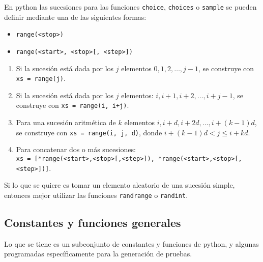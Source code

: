 \documentclass[12pt]{article}
\theoremstyle{definition}
\newtheorem{funcion}{}[section]
\begin{document}
En python las sucesiones para las funciones \verb|choice|, \verb|choices| o \verb|sample| se pueden definir mediante una de las siguientes formas:
\begin{itemize}
  \item \verb|range(<stop>)|
  \item \verb|range(<start>, <stop>[, <step>])|
\end{itemize}


\begin{enumerate}
  \item Si la sucesión está dada por los $j$ elementos $0, 1, 2, \dots, j - 1$, se construye con \verb|xs = range(j)|.
  \item Si la sucesión está dada por los $j$ elementos: $i, i+1, i+2, \dots, i + j - 1$, se construye con \verb|xs = range(i, i+j)|.
  \item Para una sucesión aritmética de $k$ elementos $i, i + d, i + 2d, \dots, i + (k-1)d$, se construye con \verb|xs = range(i, j, d)|, donde $i + (k-1)d < j \leq i + kd$.
  \item Para concatenar dos o más sucesiones:\\[1ex]
    \verb|xs = [*range(<start>,<stop>[,<step>]), *range(<start>,<stop>[,<step>])]|.
\end{enumerate}

Si lo que se quiere es tomar un elemento aleatorio de una sucesión simple, entonces mejor utilizar las funciones \verb|randrange| o \verb|randint|. 

\subsection{Constantes y funciones generales}
Lo que se tiene es un subconjunto de constantes y funciones de python, y algunas programadas específicamente para la generación de pruebas.

\end{document}
